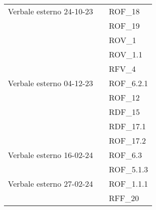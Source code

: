 \begin{xltabular}{\textwidth}{ p{0.3\textwidth} | X | p{0.2\textwidth} }
    Verbale esterno 24-10-23 & & ROF\_18\\ 
    &&ROF\_19\\ 
    &&ROV\_1\\ 
    &&ROV\_1.1\\ 
    &&RFV\_4\\ 


    Verbale esterno 04-12-23 & & ROF\_6.2.1\\
    &&ROF\_12\\
    &&RDF\_15\\
    &&RDF\_17.1\\
    &&ROF\_17.2\\


    Verbale esterno 16-02-24 & & ROF\_6.3\\
    &&ROF\_5.1.3\\

     Verbale esterno 27-02-24 & & ROF\_1.1.1\\
     && RFF\_20\\ 
    

\end{xltabular}
